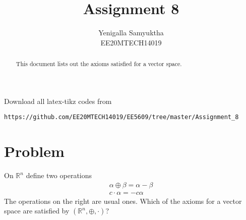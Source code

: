 \documentclass[journal,12pt,twocolumn]{IEEEtran}
\begin{document}
     \def\rightbox#1{\makebox[0in][r]{#1}}
     \def\centbox#1{\makebox[0in]{#1}}
     \def\topbox#1{\raisebox{-\baselineskip}[0in][0in]{#1}}
     \def\midbox#1{\raisebox{-0.5\baselineskip}[0in][0in]{#1}}
\vspace{3cm}
\title{Assignment 8}
\author{Yenigalla Samyuktha\\EE20MTECH14019}
\maketitle
\newpage
\bigskip
\renewcommand{\thefigure}{\theenumi}
\renewcommand{\thetable}{\theenumi}
\begin{abstract}
This document lists out the axioms satisfied for a vector space.
\end{abstract}
Download all latex-tikz codes from 
%
\begin{lstlisting}
https://github.com/EE20MTECH14019/EE5609/tree/master/Assignment_8
\end{lstlisting}
%
\section{Problem}
On $\mathbb{R}^n$  define two operations
\begin{align}
\alpha\oplus\beta=\alpha-\beta\\
c\cdot\alpha=-c\alpha
\end{align}
The operations on the right are usual ones. Which of the axioms for a vector space are satisfied by $(\mathbb{R}^n,\oplus,\cdot)$?
\end{document}

